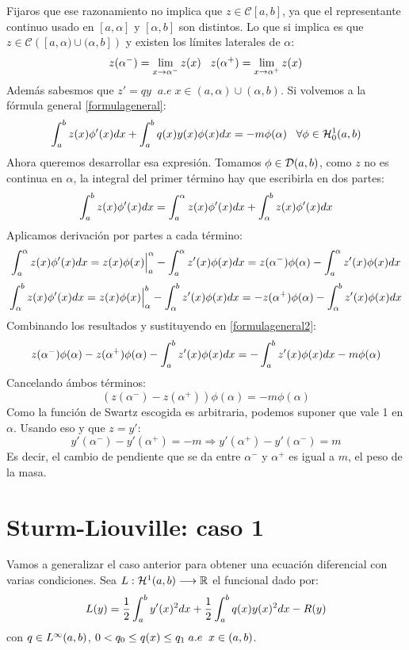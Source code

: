 Fijaros que ese razonamiento no implica que $z\in\mathcal{C}[a,b]$, ya que el representante continuo usado en $[a,\alpha]$ y $[\alpha,b]$ son distintos. Lo que si implica es que $z\in\mathcal{C}\left([a,\alpha)\cup(\alpha,b]\right)$ y existen los límites laterales de $\alpha$:
\[
z(\alpha^-)=\displaystyle\lim_{ x \to \alpha^- } z(x) \;\;\; z(\alpha^+)=\displaystyle\lim_{ x \to \alpha^+ } z(x)
\]
Además sabesmos que $z'=qy \;\; a.e \; x \in(a,\alpha)\cup(\alpha,b)$. Si volvemos a la fórmula general \eqref{formulageneral}:
\begin{equation}
\label{formulageneral2}
\displaystyle\int_{ a }^{ b } z(x)\phi'(x)dx+\displaystyle\int_{ a }^{ b } q(x)y(x)\phi(x)dx=-m\phi(\alpha) \;\;\; \forall\phi\in\mathcal{H}_0^{ 1 } (a,b)
\end{equation}
Ahora queremos desarrollar esa expresión. Tomamos $\phi\in\mathcal{D}(a,b)$, como $z$ no es continua en $\alpha$, la integral del primer término hay que escribirla en dos partes:
\[
\displaystyle\int_{ a }^{ b } z(x)\phi'(x)dx=\displaystyle\int_{ a }^{ \alpha } z(x)\phi'(x)dx+\displaystyle\int_{ \alpha }^{ b } z(x)\phi'(x)dx
\]
Aplicamos derivación por partes a cada término:
\[
\displaystyle\int_{ a }^{ \alpha } z(x)\phi'(x)dx=z(x)\phi(x)\Big|_a^\alpha-\displaystyle\int_{ a }^{ \alpha } z'(x)\phi(x)dx=z(\alpha^-)\phi(\alpha)-\displaystyle\int_{ a }^{ \alpha } z'(x)\phi(x)dx
\]
\[
\displaystyle\int_{ \alpha }^{ b } z(x)\phi'(x)dx=z(x)\phi(x)\Big|_\alpha^b-\displaystyle\int_{ \alpha }^{ b } z'(x)\phi(x)dx=-z(\alpha^+)\phi(\alpha)-\displaystyle\int_{ \alpha }^{ b } z'(x)\phi(x)dx
\]
Combinando los resultados y sustituyendo en \eqref{formulageneral2}:
\[
z(\alpha^-)\phi(\alpha)-z(\alpha^+)\phi(\alpha)-\displaystyle\int_{ a }^{ b } z'(x)\phi(x)dx=-\displaystyle\int_{ a }^{ b } z'(x)\phi(x)dx-m\phi(\alpha)
\]
Cancelando ámbos términos:
\[
\left(z(\alpha^-)-z(\alpha^+)\right)\phi(\alpha)=-m\phi(\alpha)
\]
Como la función de Swartz escogida es arbitraria, podemos suponer que vale 1 en $\alpha$. Usando eso y que $z=y'$:
\[
y'(\alpha^-)-y'(\alpha^+)=-m \Rightarrow y'(\alpha^+)-y'(\alpha^-)=m  
\]
Es decir, el cambio de pendiente que se da entre $\alpha^-$ y $\alpha^+$ es igual a $m$, el peso de la masa.

\section{Sturm-Liouville: caso 1}

Vamos a generalizar el caso anterior para obtener una ecuación diferencial con varias condiciones. Sea $L : \mathcal{H}^{ 1 } (a,b) \longrightarrow \mathbb{R}$ el funcional dado por:
\[
L(y)=\frac{1}{2}\displaystyle\int_{ a }^{ b } y'(x)^2dx+\frac{1}{2}\displaystyle\int_{ a }^{ b } q(x)y(x)^2dx-R(y)
\]
con $q\in L^{ \infty }(a,b)$, $0<q_0\leq q(x)\leq q_1 \; a.e \;\; x\in(a,b)$. 

